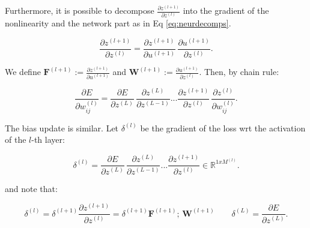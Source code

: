 \noindent Furthermore, it is possible to decompose $\frac{\partial z^{(l+1)}}{\partial z^{(l)}}$ into the gradient of the nonlinearity and the network part as in Eq \ref{eq:neurdecomps}. 

\begin{Equation}[H]
	\centering
	\begin{equation} \label{eq:neurdecomps}
		\frac{\partial z^{(l+1)}}{\partial z^{(l)}} = \frac{\partial z^{(l+1)}}{\partial u^{(l+1)}} \, \frac{\partial u^{(l+1)}}{\partial z^{(l)}}.
	\end{equation}
\end{Equation}

\noindent We define $\bm{F}^{(l+1)}:= \frac{\partial z^{(l+1)}}{\partial u^{(l+1)}}$ and $\bm{W}^{(l+1)}:= \frac{\partial u^{(l+1)}}{\partial z^{(l)}}$. Then, by chain rule:

\begin{Equation}[H]
	\centering
	\begin{equation} \label{eq:neurdecomps}
		\frac{\partial E}{\partial w^{(l)}_{ij}} = \frac{\partial E}{\partial z^{(L)}} \, \frac{\partial z^{(L)}}{\partial z^{(L-1)}} ... \frac{\partial z^{(l+1)}}{\partial z^{(l)}} \, \frac{\partial z^{(l)}}{\partial w^{(l)}_{ij}}.
	\end{equation}
\end{Equation}

\noindent The bias update is similar. Let $\delta^{(l)}$ be the gradient of the loss \gls{wrt} the activation of the $l$-th layer:

\begin{Equation}[H]
	\centering
	\begin{equation} \label{eq:neurdecomps}
		\delta^{(l)} = \frac{\partial E}{\partial z^{(L)}} \, \frac{\partial z^{(L)}}{\partial z^{(L-1)}} ... \frac{\partial z^{(l+1)}}{\partial z^{(l)}} \in \mathbb{R}^{1 x M^{(l)}} .
	\end{equation}
\end{Equation}

\noindent and note that:

\begin{Equation}[H]
	\centering
	\begin{equation} \label{eq:neurdecomps}
		\delta^{(l)} = \delta^{(l+1)} \frac{\partial z^{(l+1)}}{\partial z^{(l)}} = \delta^{(l+1)} \bm{F}^{(l+1)}; \, \bm{W}^{(l+1)} \quad\quad \delta^{(L)} = \frac{\partial E}{\partial z^{(L)}} .
	\end{equation}
\end{Equation}

